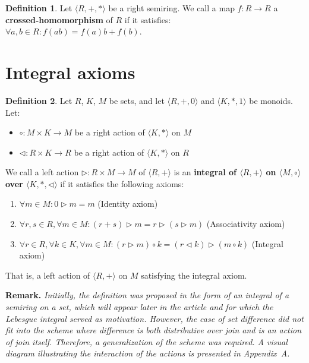 \documentclass[12pt]{article}
\theoremstyle{definition}
\newtheorem{definition}{Definition}[section]
\begin{document}
\vspace{5pt}
\begin{definition}  Let $\langle R, +, * \rangle$ be a right semiring. We call a map $f: R \to R$ a \textbf{crossed-homomorphism} of $R$ if it satisfies:
$\forall a, b \in R: f(ab) = f(a)b + f(b)$.
\end{definition}


\section{Integral axioms}


\begin{definition} Let $R$, $K$, $M$ be sets, and let $\langle R, +, 0 \rangle$ and $\langle K, *, 1 \rangle$ be monoids. Let:

\begin{itemize}
\item $\circ: M \times K \to M$ be a right action of $\langle K, * \rangle$ on $M$
\item $\lhd: R \times K \to R$ be a right action of $\langle K, * \rangle$ on $R$
\end{itemize}

We call a left action $\triangleright: R \times M \to M$ of $\langle R, + \rangle$ is an \textbf{integral of $\langle R, + \rangle$ on $\langle M, \circ \rangle$ over $\langle K, *, \lhd \rangle$} if it satisfies the following axioms:

\begin{enumerate}
\item $\forall m \in M: 0 \triangleright m = m$ \hfill (Identity axiom)
\item $\forall r, s \in R, \forall m \in M: (r + s) \triangleright m = r \triangleright (s \triangleright m)$ \hfill (Associativity axiom)
\item $\forall r \in R, \forall k \in K, \forall m \in M: (r \triangleright m) \circ k = (r \lhd k) \triangleright (m \circ k)$ \hfill (Integral axiom)
\end{enumerate}

That is, a left action of $\langle R, +\rangle$ on $M$ satisfying the integral axiom.
\end{definition}

\vspace{10pt}
\noindent\textbf{Remark.} \textit{Initially, the definition was proposed in the form of an integral of a semiring on a set, 
which will appear later in the article and for which the Lebesgue integral served as motivation. 
However, the case of set difference did not fit into the scheme where difference is both 
distributive over join and is an action of join itself. Therefore, a generalization of the scheme 
was required. A visual diagram illustrating the interaction of the actions 
is presented in Appendix~A.}
\end{document}
